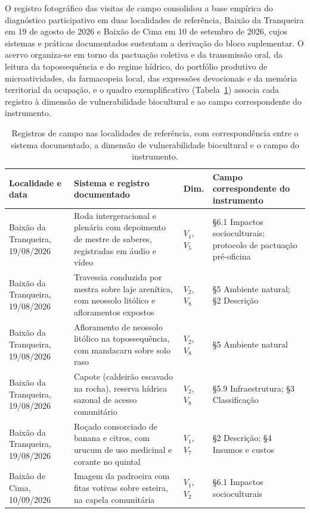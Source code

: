 O registro fotográfico das visitas de campo consolidou a base empírica do diagnóstico participativo em duas localidades de referência, Baixão da Tranqueira em 19 de agosto de 2026 e Baixão de Cima em 10 de setembro de 2026, cujos sistemas e práticas documentados sustentam a derivação do bloco suplementar. O acervo organiza-se em torno da pactuação coletiva e da transmissão oral, da leitura da topossequência e do regime hídrico, do portfólio produtivo de microatividades, da farmacopeia local, das expressões devocionais e da memória territorial da ocupação, e o quadro exemplificativo (Tabela~\ref{tab:quadro_localidades}) associa cada registro à dimensão de vulnerabilidade biocultural e ao campo correspondente do instrumento.

\begin{table}[H]
\centering
\caption{Registros de campo nas localidades de referência, com correspondência entre o sistema documentado, a dimensão de vulnerabilidade biocultural e o campo do instrumento.}
\label{tab:quadro_localidades}
\small
\setlength{\tabcolsep}{4pt}
\begin{tabular}{p{3.4cm}p{4.4cm}p{1.3cm}p{3.9cm}}
\toprule
\textbf{Localidade e data} & \textbf{Sistema e registro documentado} & \textbf{Dim.} & \textbf{Campo correspondente do instrumento} \\
\midrule
Baixão da Tranqueira, 19/08/2026 & Roda intergeracional e plenária com depoimento de mestre de saberes, registradas em áudio e vídeo & $V_1$, $V_5$ & §6.1 Impactos socioculturais; protocolo de pactuação pré-oficina \\
\addlinespace
Baixão da Tranqueira, 19/08/2026 & Travessia conduzida por mestra sobre laje arenítica, com neossolo litólico e afloramentos expostos & $V_2$, $V_8$ & §5 Ambiente natural; §2 Descrição \\
\addlinespace
Baixão da Tranqueira, 19/08/2026 & Afloramento de neossolo litólico na topossequência, com mandacaru sobre solo raso & $V_2$, $V_8$ & §5 Ambiente natural \\
\addlinespace
Baixão da Tranqueira, 19/08/2026 & Capote (caldeirão escavado na rocha), reserva hídrica sazonal de acesso comunitário & $V_2$, $V_8$ & §5.9 Infraestrutura; §3 Classificação \\
\addlinespace
Baixão da Tranqueira, 19/08/2026 & Roçado consorciado de banana e citros, com urucum de uso medicinal e corante no quintal & $V_1$, $V_7$ & §2 Descrição; §4 Insumos e custos \\
\addlinespace
Baixão de Cima, 10/09/2026 & Imagem da padroeira com fitas votivas sobre esteira, na capela comunitária & $V_1$, $V_2$ & §6.1 Impactos socioculturais \\

\end{tabular}
\end{table}
